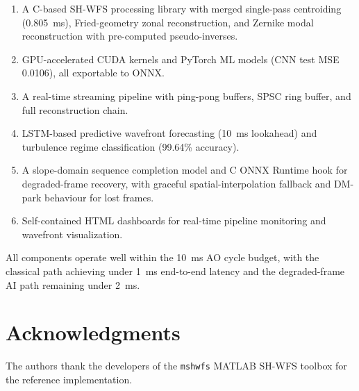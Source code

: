 \documentclass[twocolumn,10pt]{IEEEtran}
\begin{document}
\begin{enumerate}
\item A C-based SH-WFS processing library with merged single-pass centroiding (0.805~ms), Fried-geometry zonal reconstruction, and Zernike modal reconstruction with pre-computed pseudo-inverses.
\item GPU-accelerated CUDA kernels and PyTorch ML models (CNN test MSE 0.0106), all exportable to ONNX.
\item A real-time streaming pipeline with ping-pong buffers, SPSC ring buffer, and full reconstruction chain.
\item LSTM-based predictive wavefront forecasting (10~ms lookahead) and turbulence regime classification (99.64\% accuracy).
\item A slope-domain sequence completion model and C ONNX Runtime hook for degraded-frame recovery, with graceful spatial-interpolation fallback and DM-park behaviour for lost frames.
\item Self-contained HTML dashboards for real-time pipeline monitoring and wavefront visualization.
\end{enumerate}

All components operate well within the 10~ms AO cycle budget, with the classical path achieving under 1~ms end-to-end latency and the degraded-frame AI path remaining under 2~ms.

\section*{Acknowledgments}

The authors thank the developers of the \texttt{mshwfs} MATLAB SH-WFS toolbox for the reference implementation.
\end{document}

